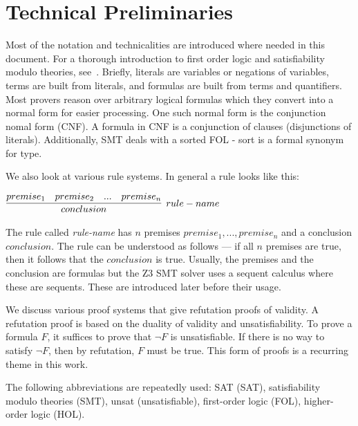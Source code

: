 \documentclass{article}
\begin{document}
\section{Technical Preliminaries}
\label{sec:prelim}
	Most of the notation and technicalities are 
	introduced where needed in this document. For a 
	thorough introduction to first order logic and 
	satisfiability modulo theories, 
	see~\cite{DBLP:reference/mc/BarrettT18}.
	Briefly, literals are variables or negations of 
	variables, terms are built from literals, and formulas 
	are built from terms and quantifiers. Most 
	provers reason over arbitrary logical formulas
	which they convert into a normal form for 
	easier processing. One such normal form is 
	the conjunction nomal form (CNF). A formula in 
	CNF is a conjunction of clauses (disjunctions 
	of literals). Additionally, SMT deals with a 
	sorted FOL - sort is a formal synonym for type. 
	
	We also look at various rule systems. In 
	general a rule looks like this:
	\begin{center}
		$\infer[rule-name]{conclusion}
			{premise_1 & premise_2 & ... & premise_n}$
	\end{center}
	The rule called \textit{rule-name} has $n$ 
	premises $premise_1, ... , premise_n$ and a 
	conclusion $conclusion$. The rule can be 
	understood as follows --- if all $n$ premises 
	are true, then it follows that the $conclusion$
	is true. Usually, the premises and the conclusion 
	are formulas but the Z3 SMT solver uses a 
	sequent calculus where these are sequents. 
	These are introduced later before their usage.
	
	We discuss various proof systems that give 
	refutation proofs of validity. A refutation 
	proof is based on the duality of validity 
	and unsatisfiability. To prove a formula 
	$F$, it suffices to prove that $\neg F$ is 
	unsatisfiable. If there is no way to satisfy 
	$\neg F$, then by refutation, $F$ must be true.
	This form of proofs is a recurring theme in this 
	work.
	
	The following abbreviations are repeatedly used:
	SAT (SAT), satisfiability modulo theories (SMT),
	unsat (unsatisfiable), first-order logic (FOL), 
	higher-order logic (HOL).
	
	
\end{document}
